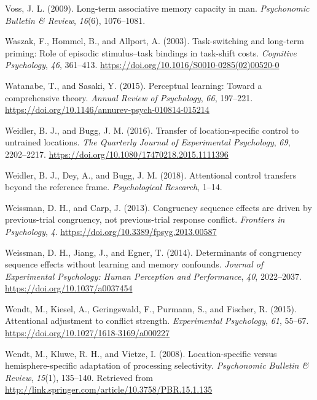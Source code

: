 \documentclass[]{DissertateCUNY}
\begin{document}
\leavevmode\hypertarget{ref-voss_long-term_2009}{}%
Voss, J. L. (2009). Long-term associative memory capacity in man.
\emph{Psychonomic Bulletin \& Review}, \emph{16}(6), 1076--1081.

\leavevmode\hypertarget{ref-waszak_task-switching_2003}{}%
Waszak, F., Hommel, B., and Allport, A. (2003). Task-switching and
long-term priming: Role of episodic stimulus--task bindings in
task-shift costs. \emph{Cognitive Psychology}, \emph{46}, 361--413.
\url{https://doi.org/10.1016/S0010-0285(02)00520-0}

\leavevmode\hypertarget{ref-watanabe_perceptual_2015}{}%
Watanabe, T., and Sasaki, Y. (2015). Perceptual learning: Toward a
comprehensive theory. \emph{Annual Review of Psychology}, \emph{66},
197--221. \url{https://doi.org/10.1146/annurev-psych-010814-015214}

\leavevmode\hypertarget{ref-weidler_transfer_2016}{}%
Weidler, B. J., and Bugg, J. M. (2016). Transfer of location-specific
control to untrained locations. \emph{The Quarterly Journal of
Experimental Psychology}, \emph{69}, 2202--2217.
\url{https://doi.org/10.1080/17470218.2015.1111396}

\leavevmode\hypertarget{ref-weidler_attentional_2018}{}%
Weidler, B. J., Dey, A., and Bugg, J. M. (2018). Attentional control
transfers beyond the reference frame. \emph{Psychological Research},
1--14.

\leavevmode\hypertarget{ref-weissman_congruency_2013}{}%
Weissman, D. H., and Carp, J. (2013). Congruency sequence effects are
driven by previous-trial congruency, not previous-trial response
conflict. \emph{Frontiers in Psychology}, \emph{4}.
\url{https://doi.org/10.3389/fpsyg.2013.00587}

\leavevmode\hypertarget{ref-weissman_determinants_2014}{}%
Weissman, D. H., Jiang, J., and Egner, T. (2014). Determinants of
congruency sequence effects without learning and memory confounds.
\emph{Journal of Experimental Psychology: Human Perception and
Performance}, \emph{40}, 2022--2037.
\url{https://doi.org/10.1037/a0037454}

\leavevmode\hypertarget{ref-wendt_attentional_2015}{}%
Wendt, M., Kiesel, A., Geringswald, F., Purmann, S., and Fischer, R.
(2015). Attentional adjustment to conflict strength. \emph{Experimental
Psychology}, \emph{61}, 55--67.
\url{https://doi.org/10.1027/1618-3169/a000227}

\leavevmode\hypertarget{ref-wendt_location-specific_2008}{}%
Wendt, M., Kluwe, R. H., and Vietze, I. (2008). Location-specific versus
hemisphere-specific adaptation of processing selectivity.
\emph{Psychonomic Bulletin \& Review}, \emph{15}(1), 135--140. Retrieved
from \url{http://link.springer.com/article/10.3758/PBR.15.1.135}
\end{document}
